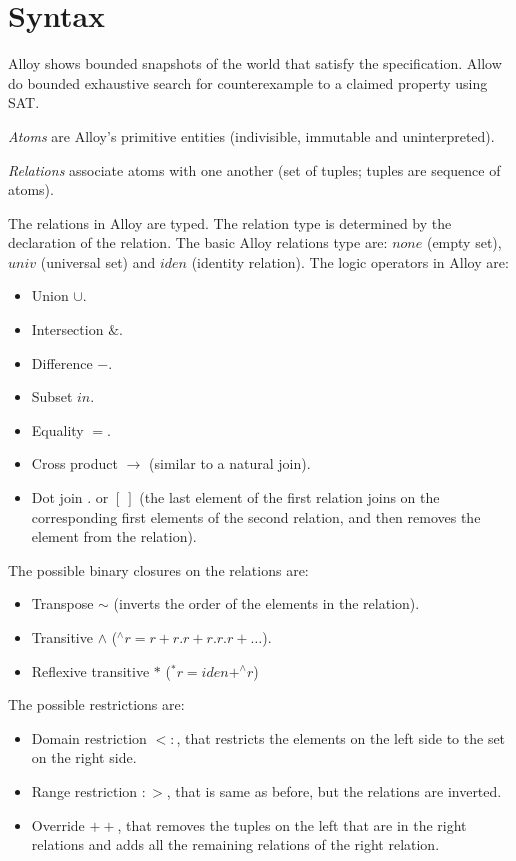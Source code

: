 \documentclass[12pt, a4paper]{report}
\begin{document}
    \section{Syntax}
        Alloy shows bounded snapshots of the world that satisfy the specification. Allow do bounded exhaustive search for counterexample to a claimed property using SAT.
        \begin{definition}
            \emph{Atoms} are Alloy's primitive entities (indivisible, immutable and uninterpreted). 
        \end{definition}
        \begin{definition}
            \emph{Relations} associate atoms with one another (set of tuples; tuples are sequence of atoms).
        \end{definition}
        The relations in Alloy are typed. The relation type is determined by the declaration of the relation. The basic Alloy relations type are: $none$ (empty set), $univ$ (universal set) and $iden$ (identity relation). The logic operators in Alloy are: 
        \begin{itemize}
            \item Union $\cup$.
            \item Intersection $\&$.
            \item Difference $-$.
            \item Subset $in$.
            \item Equality $=$.
            \item Cross product $\rightarrow$ (similar to a natural join). 
            \item Dot join $.$ or $[\:]$ (the last element of the first relation joins on the corresponding first elements of the second relation, and then removes the element from the relation).
        \end{itemize}
        The possible binary closures on the relations are: 
        \begin{itemize}
            \item Transpose $\sim$ (inverts the order of the elements in the relation).
            \item Transitive $\land$ ($^{\land}r=r+r.r+r.r.r+\dots$). 
            \item Reflexive transitive $*$ ($^{*}r=iden+^{\land}r$)
        \end{itemize}
        The possible restrictions are: 
        \begin{itemize}
            \item Domain restriction $<:$, that restricts the elements on the left side to the set on the right side.
            \item Range restriction $:>$, that is same as before, but the relations are inverted. 
            \item Override $++$, that removes the tuples on the left that are in the right relations and adds all the remaining relations of the right relation. 
        \end{itemize}
\end{document}
